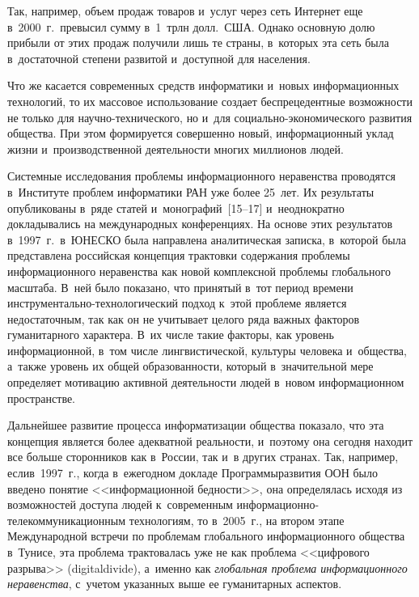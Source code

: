 \begin{multicols}{2}
    Так, например, объем продаж товаров и~услуг через сеть Интернет еще 
в~2000~г.\ превысил сумму в~1~трлн долл.\ США. Однако 
основную долю прибыли от этих продаж получили лишь те страны, 
в~которых эта сеть была в~достаточной степени развитой и~доступной для 
населения.
    
    Что же касается современных средств информатики и~новых 
информационных технологий, то их массовое использование создает 
беспрецедентные возможности не только для на\-уч\-но-тех\-ни\-че\-ско\-го, 
но и~для со\-ци\-аль\-но-эко\-но\-ми\-че\-ско\-го развития общества. При этом 
формируется совершенно новый, информационный уклад жизни 
и~производственной деятельности многих миллионов людей.
    
    Системные исследования проблемы информационного неравенства 
проводятся в~Институте проб\-лем информатики РАН уже более 25~лет. Их 
результаты опубликованы в~ряде статей и~монографий~[15--17] 
и~неоднократно докладывались на международных конференциях. 
    На основе этих результатов в~1997~г.\ в~\mbox{ЮНЕСКО} была направлена 
аналитическая записка, в~которой была представлена российская концепция 
трактовки содержания проблемы информационного неравенства как новой 
комплексной проблемы глобального масштаба. В~ней было показано, что 
принятый в~тот период времени  
ин\-ст\-ру\-мен\-таль\-но-тех\-но\-ло\-ги\-че\-ский подход к~этой проблеме 
является недостаточным, так как он не учитывает целого ряда важных 
факторов гуманитарного характера. В~их числе такие факторы, как уровень 
информационной, в~том числе лингвистической, культуры человека 
и~общества, а~также уровень их общей образованности, который 
в~значительной мере определяет мотивацию активной деятельности людей 
в~новом информационном пространстве.
    
    Дальнейшее развитие процесса информатизации общества показало, что 
эта концепция является более адекватной реальности, и~поэтому она сегодня 
находит все больше сторонников как в~России, так и~в других странах. Так, 
например, если\linebreak в~1997~г., когда в~ежегодном докладе Программы\linebreak развития 
ООН было введено понятие <<информационной бедности>>, она 
определялась исходя из возможностей доступа людей к~современным  
ин\-фор\-ма\-ци\-он\-но-те\-ле\-ком\-му\-ни\-ка\-ци\-он\-ным технологиям, то 
в~2005~г., на втором этапе Международной встречи по проб\-ле\-мам 
глобального информационного общества в~Тунисе, эта проб\-ле\-ма 
трактовалась уже не как проблема <<цифрового разрыва>> (digitaldivide), 
а~именно как \textit{глобальная проблема информационного неравенства}, 
с~учетом указанных выше ее гуманитарных аспектов.
    

\end{multicols}
